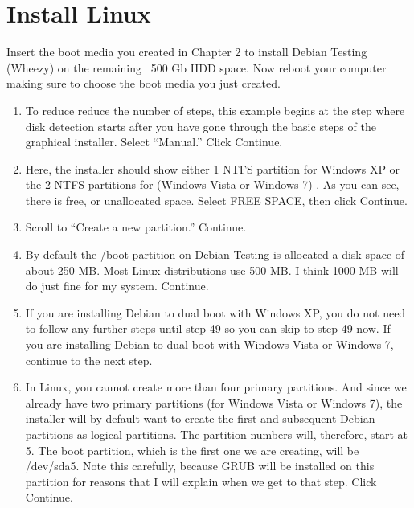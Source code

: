 \documentclass[12pt,notitlepage,onecolumn,oneside,openany]{memoir}
\begin{document}
\chapter{\textsf{Install Linux}}

\textsf{Insert the boot media you created in Chapter 2 to install Debian Testing (Wheezy) on the remaining ~500 Gb HDD space.  Now reboot your computer making sure to choose the boot media you just created.} \newline

\begin{enumerate}
\item \textsf{To reduce reduce the number of steps, this example begins at the step where disk detection starts after you have gone through the basic steps of the graphical installer. 
Select “Manual.”  Click Continue.}

\item \textsf{Here, the installer should show either 1 NTFS partition for Windows XP or the 2 NTFS partitions for (Windows Vista or Windows 7) . As you can see, there is free, or unallocated space. Select FREE SPACE, then click Continue.}

\item \textsf{Scroll to “Create a new partition.” Continue.} 

\item \textsf{By default the /boot partition on Debian Testing is allocated a disk space of about 250 MB. Most Linux distributions use 500 MB. I think 1000 MB will do just fine for my system. Continue.}

\item \textsf{If you are installing Debian to dual boot with Windows XP, you do not need to follow any further steps until step 49 so you can skip to step 49 now.  If you are installing Debian to dual boot with Windows Vista or Windows 7, continue to the next step.}

\item \textsf{In Linux, you cannot create more than four primary partitions. And since we already have two primary partitions (for Windows Vista or Windows 7), the installer will by default want to create the first and subsequent Debian partitions as logical partitions. The partition numbers will, therefore, start at 5. The boot partition, which is the first one we are creating, will be /dev/sda5. Note this carefully, because GRUB will be installed on this partition for reasons that I will explain when we get to that step. Click Continue.}


\end{enumerate}
\end{document}
